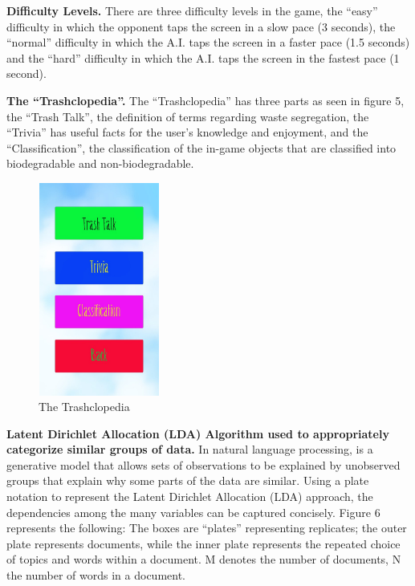 \textbf{Difficulty Levels.} There are three difficulty levels in the game, the “easy” difficulty in which the opponent taps the screen in a slow pace (3 seconds), the “normal” difficulty in which the A.I. taps the screen in a faster pace (1.5 seconds) and the “hard” difficulty in which the A.I. taps the screen in the fastest pace (1 second).

\textbf{The “Trashclopedia”.} The “Trashclopedia” has three parts as seen in figure 5, the “Trash Talk”, the definition of terms regarding waste segregation, the “Trivia” has useful facts for the user’s knowledge and enjoyment, and the “Classification”, the classification of the in-game objects that are classified into biodegradable and non-biodegradable. 

    \begin{figure}[H]
	\centering
	\includegraphics[width=4cm,height=7cm]{image/cs_figure5.jpg}
	\caption{The Trashclopedia}
	\end{figure}

\textbf{Latent Dirichlet Allocation (LDA) Algorithm used to appropriately categorize similar groups of data.}  In natural language processing, is a generative model that allows sets of observations to be explained by unobserved groups that explain why some parts of the data are similar. Using a plate notation to represent the Latent Dirichlet Allocation (LDA) approach, the dependencies among the many variables can be captured concisely. Figure 6 represents the following: The boxes are “plates” representing replicates; the outer plate represents documents, while the inner plate represents the repeated choice of topics and words within a document. M denotes the number of documents, N the number of words in a document.

